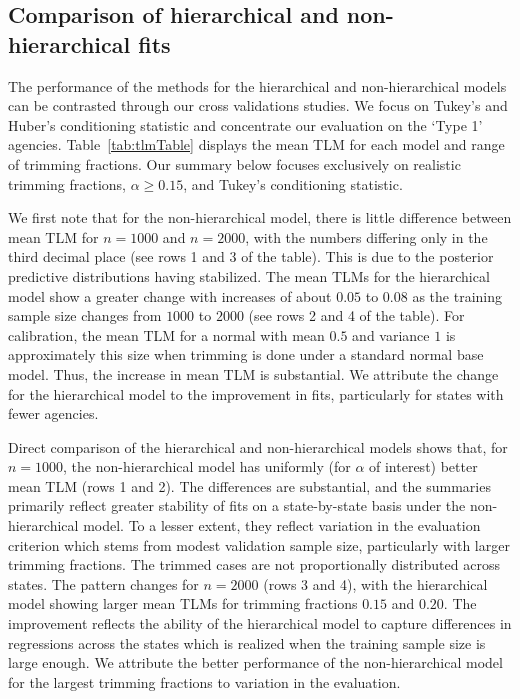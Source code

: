 \documentclass[12pt]{article}
\begin{document}
\subsection{Comparison of hierarchical and non-hierarchical fits}

The performance of the methods for the hierarchical and non-hierarchical models can be contrasted through our cross validations studies.  We focus on Tukey's and Huber's conditioning statistic and concentrate our evaluation on the `Type 1' agencies. Table~\ref{tab:tlmTable} displays the mean TLM for each model and range of trimming fractions.  Our summary below focuses exclusively on realistic trimming fractions, $\alpha \geq 0.15$, and Tukey's conditioning statistic.  

We first note that for the non-hierarchical model, there is little difference between mean TLM for $n=1000$ and $n=2000$, with 
the numbers differing only in the third decimal place (see rows 1 and 3 of the table).  This is due to the posterior predictive distributions having stabilized.  The
mean TLMs for the hierarchical model show a greater change with increases of about $0.05$ to $0.08$ as the training sample size changes
from $1000$ to $2000$ (see rows 2 and 4 of the table).  For calibration, the mean TLM for a normal with mean $0.5$ and variance $1$ is approximately this size
when trimming is done under a standard normal base model.  Thus, the increase in mean TLM is substantial.  
We attribute the change for the hierarchical model to the 
improvement in fits, particularly for states with fewer agencies.  

Direct comparison of the hierarchical and non-hierarchical models shows that, for $n=1000$, the non-hierarchical model has uniformly 
(for $\alpha$ of interest) better mean TLM (rows 1 and 2).  The differences are substantial, and the summaries primarily reflect greater stability of fits on a state-by-state basis under the non-hierarchical model.  To a lesser extent, they reflect variation in the evaluation criterion which stems from modest validation sample size, particularly with larger trimming fractions.  The trimmed cases are not proportionally distributed across states.  The pattern changes for $n=2000$ (rows 3 and 4), with the hierarchical model showing larger mean TLMs for trimming fractions $0.15$ and $0.20$.  The improvement reflects the ability of the hierarchical model to capture differences in regressions across the states which is realized when the training sample size is large enough.  We attribute the better performance of the non-hierarchical model for the largest trimming fractions to variation in the evaluation.  
\end{document}
